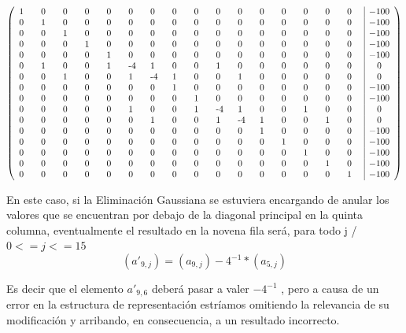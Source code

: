\documentclass[double, 1.5in, 12pt]{beavtex}
\begin{document}
$
\left(
       \begin{array}{p{5mm}p{5mm}p{5mm}p{5mm}p{5mm}p{5mm}p{5mm}p{5mm}p{5mm}p{5mm}p{5mm}p{5mm}p{5mm}p{5mm}p{5mm}p{5mm}|c}
 1 & 0 & 0 & 0 & 0 & 0 & 0 & 0  & 0 & 0 & 0 & 0 & 0 & 0 & 0 & 0 & -100  \\
 0 & 1 & 0 & 0 & 0 & 0 & 0 & 0  & 0 & 0 & 0 & 0 & 0 & 0 & 0 & 0 & -100  \\
 0 & 0 & 1 & 0 & 0 & 0 & 0 & 0  & 0 & 0 & 0 & 0 & 0 & 0 & 0 & 0 & -100  \\
 0 & 0 & 0 & 1 & 0 & 0 & 0 & 0  & 0 & 0 & 0 & 0 & 0 & 0 & 0 & 0 & -100  \\
 0 & 0 & 0 & 0 & 1 & 0 & 0 & 0  & 0 & 0 & 0 & 0 & 0 & 0 & 0 & 0 & -100  \\
 0 & 1 & 0 & 0 & 1 & -4 & 1 & 0  & 0 & 1 & 0 & 0 & 0 & 0 & 0 & 0 & 0  \\
 0 & 0 & 1 & 0 & 0 & 1 & -4 & 1  & 0 & 0 & 1 & 0 & 0 & 0 & 0 & 0 & 0  \\
 0 & 0 & 0 & 0 & 0 & 0 & 0 & 1  & 0 & 0 & 0 & 0 & 0 & 0 & 0 & 0 & -100  \\
 0 & 0 & 0 & 0 & 0 & 0 & 0 & 0  & 1 & 0 & 0 & 0 & 0 & 0 & 0 & 0 & -100  \\
 0 & 0 & 0 & 0 & 0 & 1 &  0 & 0  & 1 & -4 & 1 & 0 & 0 & 1 & 0 & 0 & 0  \\
 0 & 0 & 0 & 0 & 0 & 0 & 1 & 0  & 0 & 1 & -4 & 1 & 0 & 0 & 1 & 0 & 0  \\
 0 & 0 & 0 & 0 & 0 & 0 & 0 & 0  & 0 & 0 & 0 & 1 & 0 & 0 & 0 & 0 & -100  \\
 0 & 0 & 0 & 0 & 0 & 0 & 0 & 0  & 0 & 0 & 0 & 0 & 1 & 0 & 0 & 0 & -100  \\
 0 & 0 & 0 & 0 & 0 & 0 & 0 & 0  & 0 & 0 & 0 & 0 & 0 & 1 & 0 & 0 & -100  \\
 0 & 0 & 0 & 0 & 0 & 0 & 0 & 0  & 0 & 0 & 0 & 0 & 0 & 0 & 1 & 0 & -100  \\
 0 & 0 & 0 & 0 & 0 & 0 & 0 & 0  & 0 & 0 & 0 & 0 & 0 & 0 & 0 & 1 & -100  \\
       \end{array}
\right)
$

\emptyline
En este caso, si la Eliminaci\'on Gaussiana se estuviera encargando de anular los valores que se encuentran por debajo de la diagonal principal en la quinta columna, eventualmente el resultado en la novena fila ser\'a, para todo j / $ 0<=j<=15$  \begin{equation}
(a'_{9,j}) = (a_{9,j}) - 4^{-1}*(a_{5,j})
\end{equation}

Es decir que el elemento $a'_{9,6}$ deber\'a pasar a valer $-4^{-1}$ , pero a causa de un error en la estructura de representaci\'on estr\'iamos omitiendo la relevancia de su modificaci\'on y arribando, en consecuencia, a un resultado incorrecto.
\end{document}
